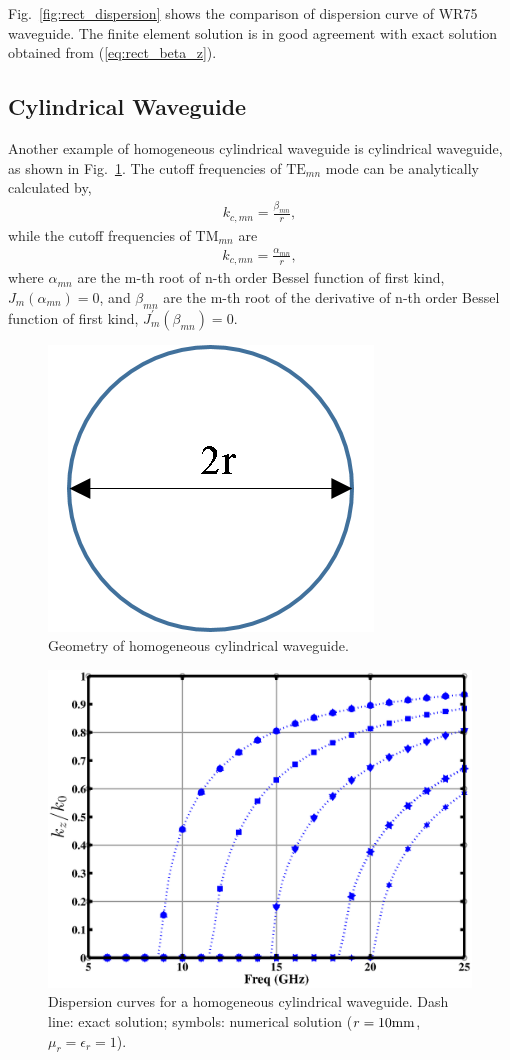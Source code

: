 \documentclass{pj}
\begin{document}
Fig.~\ref{fig:rect_dispersion} shows the comparison of dispersion curve of WR75 waveguide. The finite element solution is in good agreement with exact solution obtained from (\ref{eq:rect_beta_z}).

\subsection{Cylindrical Waveguide}
Another example of homogeneous cylindrical waveguide is cylindrical waveguide, as shown in Fig.~\ref{fig:cylin_geom}.  The cutoff frequencies of $\mathrm{TE}_{mn}$ mode can be analytically calculated by,
\begin{eqnarray}
k_{c,mn} = \frac{\beta_{mn}}{r},  
\end{eqnarray}
while the cutoff frequencies of $\mathrm{TM}_{mn}$ are
\begin{eqnarray}
k_{c,mn} = \frac{\alpha_{mn}}{r},
\end{eqnarray}
where $\alpha_{mn}$ are the m-th root of n-th order Bessel function of first kind, $J_m(\alpha_{mn})=0$, and $\beta_{mn}$ are the m-th root of the derivative of n-th order Bessel function of first kind, $J_m^\prime(\beta_{mn})=0$. 

\begin{figure}[htbp]
	\centering
	\includegraphics[width=0.3\columnwidth]{./img/cylindrical/geometry.png}
	\caption{Geometry of homogeneous cylindrical waveguide. }
	\label{fig:cylin_geom}
\end{figure}
\begin{figure}[htbp]
	\centering
	\includegraphics[width=\defaultfigurewidth]{./img/cylindrical/dispersion.eps}
	\caption{Dispersion curves for a homogeneous cylindrical waveguide. Dash line: exact solution; symbols: numerical solution ($r=10\rm{mm}$, $\mu_r=\epsilon_r=1$).}
	\label{fig:cylin_dispersion}
\end{figure}
\end{document}
